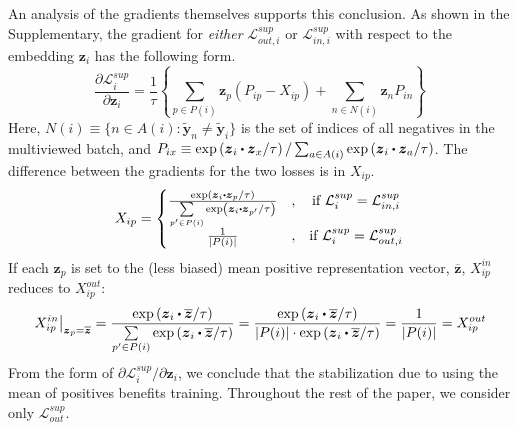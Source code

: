 An analysis of the gradients themselves supports this conclusion. As shown in the Supplementary, the gradient for \emph{either} $\mathcal{L}_{out,i}^{sup}$ or $\mathcal{L}_{in,i}^{sup}$ with respect to the embedding $\boldsymbol{z}_i$ has the following form. %
\begin{equation}
  \label{eqn:gradient}
  \frac{\partial\mathcal{L}_i^{sup}}{\partial\boldsymbol{z}_i} = \frac{1}{\tau}\left\{
  \sum_{p\in P(i)}\boldsymbol{z}_p(P_{ip}-X_{ip})+
  \sum_{n\in N(i)}\boldsymbol{z}_nP_{in}
  \right\}
\end{equation}
Here, $N(i)\equiv\{n\in A(i):\boldsymbol{\tilde{y}}_n\neq\boldsymbol{\tilde{y}}_i\}$ is the set of indices of all negatives in the multiviewed batch, and $P_{ix}\equiv\text{exp}\left(\boldsymbol{z}_i\bigcdot\boldsymbol{z}_x/\tau\right)/\sum_{a\in A(i)}\text{exp}\left(\boldsymbol{z}_i\bigcdot\boldsymbol{z}_a/\tau\right)$. The difference between the gradients for the two losses is in $X_{ip}$.
\begin{equation}
  X_{ip}=\left\{
  \begin{matrix}
  \frac{\text{exp}\left(\boldsymbol{z}_i\bigcdot\boldsymbol{z}_p/\tau\right)}{\sum\limits_{p'\in P(i)}\text{exp}\left(\boldsymbol{z}_i\bigcdot\boldsymbol{z}_{p'}/\tau\right)} & , & \text{if }\mathcal{L}_i^{sup}=\mathcal{L}_{in,i}^{sup}\\
  \frac{1}{|P(i)|} & , & \text{if }\mathcal{L}_i^{sup}=\mathcal{L}_{out,i}^{sup}
  \end{matrix}\right.
\end{equation}
If each $\boldsymbol{z}_p$ is set to the (less biased) mean positive representation vector, $\overline{\boldsymbol{z}}$, $X_{ip}^{in}$ reduces to $X_{ip}^{out}$:
\begin{equation}
  \left.X_{ip}^{in}\right|_{\boldsymbol{z}_p=\overline{\boldsymbol{z}}}
  =\frac{\text{exp}\left(\boldsymbol{z}_i\bigcdot\overline{\boldsymbol{z}}/\tau\right)}{\sum\limits_{p'\in P(i)}\text{exp}\left(\boldsymbol{z}_i\bigcdot\overline{\boldsymbol{z}}/\tau\right)}
  =\frac{\text{exp}\left(\boldsymbol{z}_i\bigcdot\overline{\boldsymbol{z}}/\tau\right)}{|P(i)|\cdot\text{exp}\left(\boldsymbol{z}_i\bigcdot\overline{\boldsymbol{z}}/\tau\right)}
  =\frac{1}{|P(i)|}
  =X_{ip}^{out}
\end{equation}
From the form of $\partial\mathcal{L}_i^{sup}/\partial\boldsymbol{z}_i$, we conclude that the stabilization due to using the mean of positives benefits training. %
Throughout the rest of the paper, we consider only $\mathcal{L}_{out}^{sup}$.


